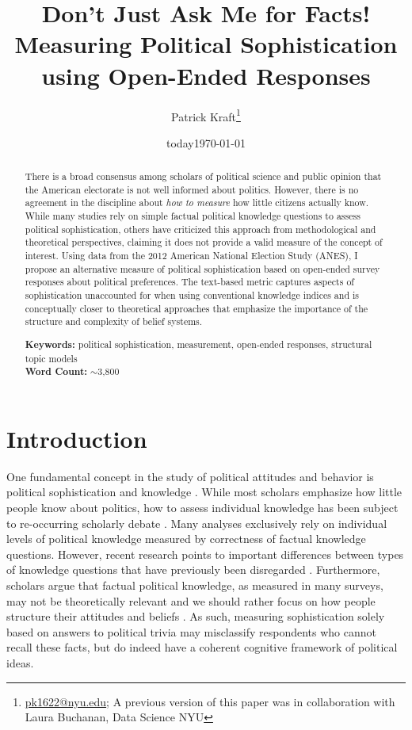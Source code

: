 \documentclass[12pt]{article}
\author{Patrick Kraft\footnote{\href{mailto:pk1622@nyu.edu}{pk1622@nyu.edu}; A previous version of this paper was in collaboration with Laura Buchanan, Data Science NYU}}
\date{today}
\title{Don't Just Ask Me for Facts!\\
\large{Measuring Political Sophistication using Open-Ended Responses}}
\date{\today}
\begin{document}
\maketitle\doublespacing\thispagestyle{empty}

\begin{abstract}
There is a broad consensus among scholars of political science and public opinion that the American electorate is not well informed about politics. However, there is no agreement in the discipline about \textit{how to measure} how little citizens actually know. While many studies rely on simple factual political knowledge questions to assess political sophistication, others have criticized this approach from methodological and theoretical perspectives, claiming it does not provide a valid measure of the concept of interest. Using data from the 2012 American National Election Study (ANES), I propose an alternative measure of political sophistication based on open-ended survey responses about political preferences. The text-based metric captures aspects of sophistication unaccounted for when using conventional knowledge indices and is conceptually closer to theoretical approaches that emphasize the importance of the structure and complexity of belief systems.

\vspace{\baselineskip}
\noindent \textbf{Keywords:} political sophistication, measurement, open-ended responses, structural topic models \\

\noindent \textbf{Word Count:} $\sim$3,800
\end{abstract}
\newpage\setcounter{page}{1}


\section{Introduction}

One fundamental concept in the study of political attitudes and behavior is political sophistication and knowledge \citep{converse1964nature,carpini1996americans}. While most scholars emphasize how little people know about politics, how to assess individual knowledge has been subject to re-occurring scholarly debate \citep[e.g.][]{mondak2000reconsidering,mondak2001asked,sturgis2008experiment,debell2013harder,pietryka2013analysis}. Many analyses exclusively rely on individual levels of political knowledge measured by correctness of factual knowledge questions. However, recent research points to important differences between types of knowledge questions that have previously been disregarded \citep{barabas2014question}. Furthermore, scholars argue that factual political knowledge, as measured in many surveys, may not be theoretically relevant \citep{lupia2006elitism} and we should rather focus on how people structure their attitudes and beliefs \citep[e.g.][]{luskin1987measuring}. As such, measuring sophistication solely based on answers to political trivia may misclassify respondents who cannot recall these facts, but do indeed have a coherent cognitive framework of political ideas.
\end{document}
